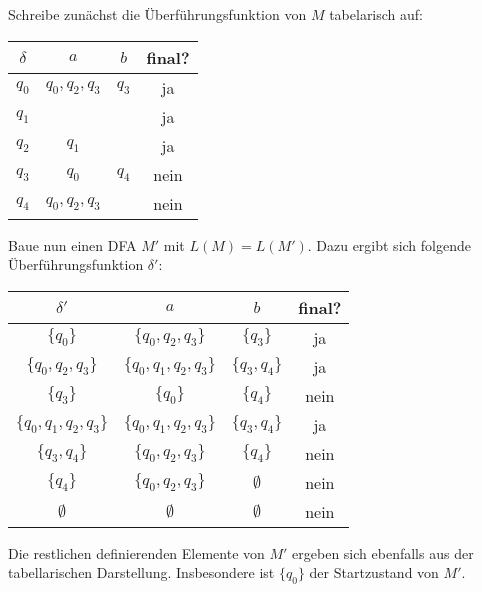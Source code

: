 
Schreibe zunächst die Überführungsfunktion von $M$ tabelarisch auf:

\begin{center}
\begin{tabular}{|c|c|c|c|}
	\hline
	$\delta$ & $a$ & $b$ & final? \\
	\hline
	$q_0$ & $q_0,q_2,q_3$ & $q_3$ & ja \\
	\hline
	$q_1$ & & & ja \\
	\hline
	$q_2$ & $q_1$ & & ja \\
	\hline
	$q_3$ & $q_0$ & $q_4$ & nein \\
	\hline
	$q_4$ & $q_0,q_2,q_3$ & & nein \\
	\hline
\end{tabular}
\end{center}

Baue nun einen DFA $M'$ mit $L(M) = L(M')$. Dazu ergibt sich folgende
Überführungsfunktion $\delta'$:

\begin{center}
\begin{tabular}{|c|c|c|c|}
	\hline
	$\delta'$ & $a$ & $b$ & final? \\
	\hline
	$\{q_0\}$ & $\{q_0,q_2,q_3\}$ & $\{q_3\}$ & ja \\
	\hline
	$\{q_0,q_2,q_3\}$ & $\{q_0,q_1,q_2,q_3\}$ & $\{q_3,q_4\}$ & ja \\
	\hline
	$\{q_3\}$ & $\{q_0\}$ & $\{q_4\}$ & nein \\
	\hline
	$\{q_0,q_1,q_2,q_3\}$ & $\{q_0,q_1,q_2,q_3\}$ & $\{q_3,q_4\}$ & ja \\
	\hline
	$\{q_3,q_4\}$ & $\{q_0,q_2,q_3\}$ & $\{q_4\}$ & nein \\
	\hline
	$\{q_4\}$ & $\{q_0,q_2,q_3\}$ & $\emptyset$ & nein \\
	\hline
	$\emptyset$ & $\emptyset$ & $\emptyset$ & nein \\
	\hline
\end{tabular}
\end{center}

Die restlichen definierenden Elemente von $M'$ ergeben sich ebenfalls aus der
tabellarischen Darstellung. Insbesondere ist $\{q_0\}$ der Startzustand von
$M'$.
